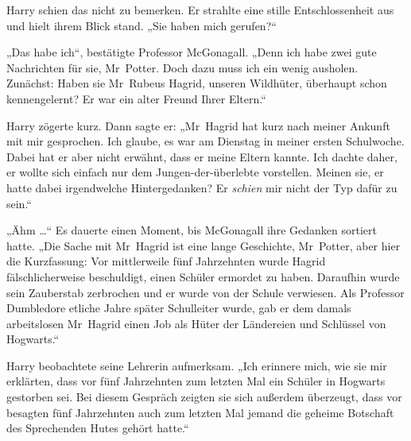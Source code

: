 Harry schien das nicht zu bemerken. Er strahlte eine stille Entschlossenheit aus und hielt ihrem Blick stand.
„Sie haben mich gerufen?“

„Das habe ich“, bestätigte Professor McGonagall.
„Denn ich habe zwei gute Nachrichten für sie, Mr~Potter. Doch dazu muss ich ein wenig ausholen. Zunächst: Haben sie Mr~Rubeus Hagrid, unseren Wildhüter, überhaupt schon kennengelernt? Er war ein alter Freund Ihrer Eltern.“

Harry zögerte kurz. Dann sagte er:
„Mr~Hagrid hat kurz nach meiner Ankunft mit mir gesprochen. Ich glaube, es war am Dienstag in meiner ersten Schulwoche. Dabei hat er aber nicht erwähnt, dass er meine Eltern kannte. Ich dachte daher, er wollte sich einfach nur dem Jungen-der-überlebte vorstellen. Meinen sie, er hatte dabei irgendwelche Hintergedanken? Er \emph{schien} mir nicht der Typ dafür zu sein.“

„Ähm …“ Es dauerte einen Moment, bis McGonagall ihre Gedanken sortiert hatte.
„Die Sache mit Mr~Hagrid ist eine lange Geschichte, Mr~Potter, aber hier die Kurzfassung: Vor mittlerweile fünf Jahrzehnten wurde Hagrid fälschlicherweise beschuldigt, einen Schüler ermordet zu haben. Daraufhin wurde sein Zauberstab zerbrochen und er wurde von der Schule verwiesen. Als Professor Dumbledore etliche Jahre später Schulleiter wurde, gab er dem damals arbeitslosen Mr~Hagrid einen Job als Hüter der Ländereien und Schlüssel von Hogwarts.“

Harry beobachtete seine Lehrerin aufmerksam.
„Ich erinnere mich, wie sie mir erklärten, dass vor fünf Jahrzehnten zum letzten Mal ein Schüler in Hogwarts gestorben sei. Bei diesem Gespräch zeigten sie sich außerdem überzeugt, dass vor besagten fünf Jahrzehnten auch zum letzten Mal jemand die geheime Botschaft des Sprechenden Hutes gehört hatte.“

